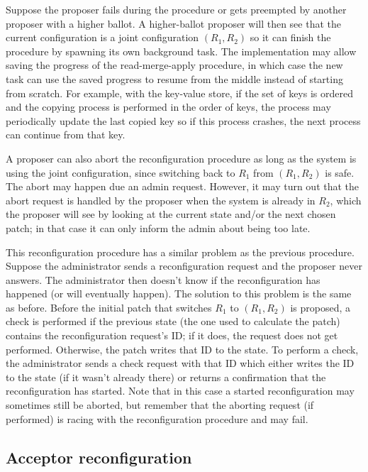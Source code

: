 \documentclass[12pt,a4paper,en]{pracamgr}
\begin{document}
Suppose the proposer fails during the procedure or gets preempted by another proposer with a higher ballot. A higher-ballot proposer will then see that the current configuration is a joint configuration $(R_1, R_2)$ so it can finish the procedure by spawning its own background task. The implementation may allow saving the progress of the read-merge-apply procedure, in which case the new task can use the saved progress to resume from the middle instead of starting from scratch. For example, with the key-value store, if the set of keys is ordered and the copying process is performed in the order of keys, the process may periodically update the last copied key so if this process crashes, the next process can continue from that key.

A proposer can also abort the reconfiguration procedure as long as the system is using the joint configuration, since switching back to $R_1$ from $(R_1, R_2)$ is safe. The abort may happen due an admin request. However, it may turn out that the abort request is handled by the proposer when the system is already in $R_2$, which the proposer will see by looking at the current state and/or the next chosen patch; in that case it can only inform the admin about being too late.

This reconfiguration procedure has a similar problem as the previous procedure. Suppose the administrator sends a reconfiguration request and the proposer never answers. The administrator then doesn't know if the reconfiguration has happened (or will eventually happen). The solution to this problem is the same as before. Before the initial patch that switches $R_1$ to $(R_1, R_2)$ is proposed, a check is performed if the previous state (the one used to calculate the patch) contains the reconfiguration request's ID; if it does, the request does not get performed. Otherwise, the patch writes that ID to the state. To perform a check, the administrator sends a check request with that ID which either writes the ID to the state (if it wasn't already there) or returns a confirmation that the reconfiguration has started. Note that in this case a started reconfiguration may sometimes still be aborted, but remember that the aborting request (if performed) is racing with the reconfiguration procedure and may fail.

\subsection{Acceptor reconfiguration}\label{acc-reconf}
\end{document}
